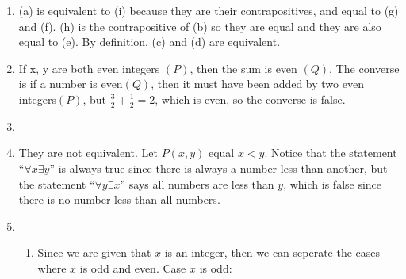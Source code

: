 \documentclass[12pt]{article}
\begin{document}
\begin{enumerate}
    \item (a) is equivalent to (i) because they are their contrapositives, and
          equal to (g) and (f). (h) is the contrapositive of (b) so they are equal and
          they are also equal to (e). By definition, (c) and (d) are
          equivalent.

    \item If x, y are both even integers $(P)$, then the sum is even $(Q)$. The converse
          is if a number is even$(Q)$, then it must have been added by two even
          integers$(P)$, but $\frac{3}{2} + \frac{1}{2} = 2$, which is even, so the
          converse is false.

    \item

    \item They are not equivalent. Let $P(x,y)$ equal $x < y$. Notice that the statement
          ``$\forall x \exists y$'' is always true since there is always a number less
          than another, but the statement ``$\forall y \exists x$'' says all numbers are
          less than $y$, which is false since there is no number less than all numbers.

    \item
          \begin{enumerate}
              \item Since we are given that $x$ is an integer, then we can seperate the cases where
                    $x$ is odd and even. \newline Case $x$ is odd:


\end{enumerate}
\end{enumerate}
\end{document}
